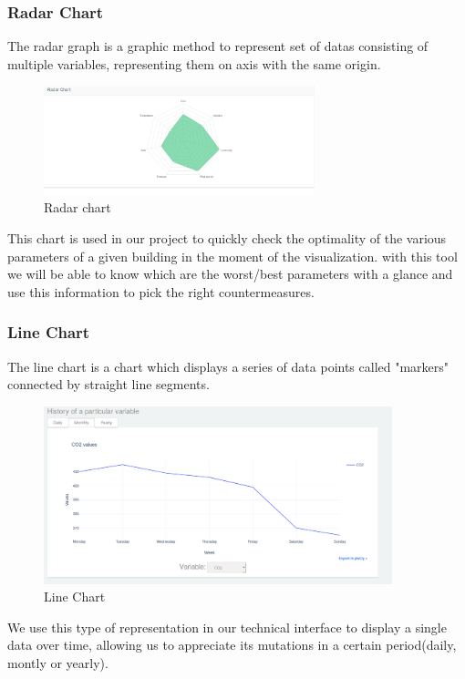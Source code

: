 \documentclass[12pt]{article} %
\begin{document}
\newpage

\subsubsection{Radar Chart}
The radar graph is a graphic method to represent set of datas consisting of multiple variables, representing them on axis with the same origin.
\begin{figure}[H]
  \centering
  \includegraphics[width=0.7\textwidth]{img/RadarChart.png}
  \caption{Radar chart}
  \label{fig:rdrChart}
\end{figure}
This chart is used in our project to quickly check the optimality of the various parameters of a given building in the moment of the visualization.
with this tool we will be able to know which are the worst/best parameters with a glance and use this information to pick the right countermeasures.

\newpage

\subsubsection{Line Chart}
The line chart is a chart which displays a series of data points called "markers" connected by straight line segments.
\begin{figure}[H]
  \centering
  \includegraphics[width=0.9\textwidth]{img/LineChart.png}
  \caption{Line Chart}
  \label{fig:lnChart}
\end{figure}
We use this type of representation in our technical interface to display a single data over time, allowing us to appreciate its mutations in a certain period(daily, montly or yearly).
\end{document}
